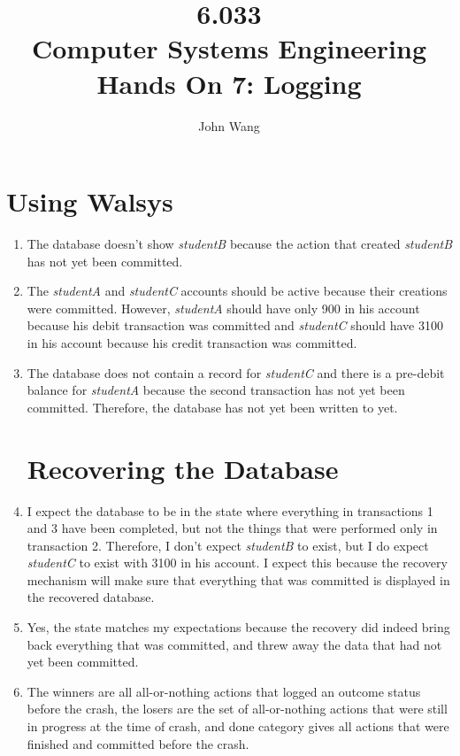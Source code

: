 \documentclass[psamsfonts]{amsart}
\title{6.033 \\
Computer Systems Engineering \\
Hands On 7: Logging}
\author{John Wang}
\begin{document}
\maketitle

\section{Using Walsys}

\begin{enumerate}
  \item The database doesn't show \emph{studentB} because the action that created \emph{studentB} has not yet been committed.
  \item The \emph{studentA} and \emph{studentC} accounts should be active because their creations were committed. However, \emph{studentA} should have only 900 in his account because his debit transaction was committed and \emph{studentC} should have 3100 in his account because his credit transaction was committed.
  \item The database does not contain a record for \emph{studentC} and there is a pre-debit balance for \emph{studentA} because the second transaction has not yet been committed. Therefore, the database has not yet been written to yet.

    \section{Recovering the Database}
  \item I expect the database to be in the state where everything in transactions 1 and 3 have been completed, but not the things that were performed only in transaction 2. Therefore, I don't expect \emph{studentB} to exist, but I do expect \emph{studentC} to exist with 3100 in his account. I expect this because the recovery mechanism will make sure that everything that was committed is displayed in the recovered database.
  \item Yes, the state matches my expectations because the recovery did indeed bring back everything that was committed, and threw away the data that had not yet been committed.
  \item The winners are all all-or-nothing actions that logged an outcome status before the crash, the losers are the set of all-or-nothing actions that were still in progress at the time of crash, and done category gives all actions that were finished and committed before the crash.


\end{enumerate}
\end{document}
